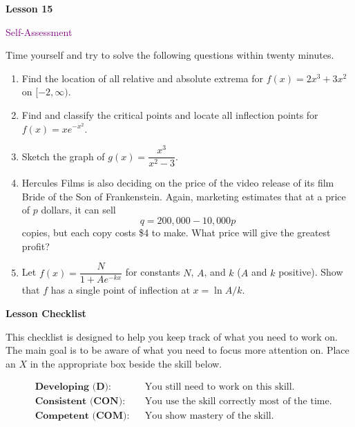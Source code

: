 \documentclass[10pt]{book}
\theoremstyle{definition}
\theoremstyle{remark}
\begin{document}
\begin{tcolorbox}[
  width=\textwidth,
  colback=gray!10, %
  colframe=white, %
  boxrule=0pt,    %
  left=1cm,       %
  right=1cm,      %
  sharp corners  %
]

\begin{minipage}[t]{0.5\textwidth}
  \Huge \textbf{Lesson 15}
\end{minipage}%
\hfill
\begin{minipage}[t]{0.5\textwidth}
  \Huge\textcolor{purple}{Self-Assessment}
\end{minipage}
\end{tcolorbox}

\begin{large}
\noindent
Time yourself and try to solve the following questions within twenty minutes. 
\begin{enumerate}
\item Find the location of all relative and absolute extrema for $f(x) = 2x^3 +3x^2$ on $[-2,\infty)$.\vfil
\item Find and classify the critical points and locate all inflection points for $f(x) = xe^{-x^2}$.\vfil
\item Sketch the graph of $g(x) = \dfrac{x^3}{x^2 - 3}$.\vfil
\item Hercules Films is also deciding on the price of the video release of its film Bride of the Son of Frankenstein. Again, marketing estimates that at a price of $p$ dollars, it can sell \[q = 200,000 - 10,000p\] copies, but each copy costs \$4 to make. What price will give the greatest profit?\vfil
\item Let $f (x) = \dfrac{N}{1 + Ae^{-kx}}$ for constants $N$, $A$, and $k$ ($A$ and $k$ positive). Show that $f$ has a single point of inflection at $x =\ln A/k$.\vfil
\end{enumerate}

\noindent
\textbf{Lesson Checklist}
\bigskip

\noindent
This checklist is designed to help you keep track of what you need to work on. The main goal is to be aware of what you need to focus more attention on. Place an $X$ in the appropriate box beside the skill below. 
\bigskip

\noindent
\begin{align*}
&\textbf{Developing (D):} &&\textrm{You still need to work on this skill.}\\
&\textbf{Consistent (CON):} &&\textrm{You use the skill correctly most of the time.}\\
&\textbf{Competent (COM):} &&\textrm{You show mastery of the skill.} 
\end{align*}
\vfil


\end{large}
\end{document}
